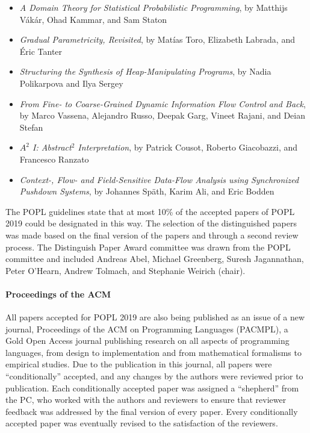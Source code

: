 \begin{itemize}
\item {\em A Domain Theory for Statistical Probabilistic Programming}, by 
Matthijs Vákár, Ohad Kammar, and Sam Staton
\item {\em Gradual Parametricity, Revisited}, by
Matías Toro, Elizabeth Labrada, and Éric Tanter
\item {\em Structuring the Synthesis of Heap-Manipulating Programs}, by 
Nadia Polikarpova and Ilya Sergey
\item {\em From Fine- to Coarse-Grained Dynamic Information Flow Control and
    Back}, by
Marco Vassena, Alejandro Russo, Deepak Garg, Vineet Rajani, and Deian Stefan
\item {\em $A^2$ I: Abstract$^2$ Interpretation}, by 
Patrick Cousot, Roberto Giacobazzi, and Francesco Ranzato
\item {\em Context-, Flow- and Field-Sensitive Data-Flow Analysis using
  Synchronized Pushdown Systems}, by
Johannes Späth, Karim Ali, and Eric Bodden
\end{itemize}

The POPL guidelines state that at most 10\% of the accepted papers of POPL
2019 could be designated in this way.  The selection of the distinguished
papers was made based on the final version of the papers and through a second
review process. The Distinguish Paper Award committee was drawn from the POPL
committee and included Andreas Abel, Michael Greenberg, Suresh Jagannathan,
Peter O'Hearn, Andrew Tolmach, and Stephanie Weirich (chair).

\paragraph{Proceedings of the ACM}
%
All papers accepted for POPL 2019 are also being published as an issue of a
new journal, Proceedings of the ACM on Programming Languages (PACMPL), a Gold
Open Access journal publishing research on all aspects of programming
languages, from design to implementation and from mathematical formalisms to
empirical studies.  Due to the publication in this journal, all papers were
``conditionally'' accepted, and any changes by the authors were reviewed prior
to publication. Each conditionally accepted paper
was assigned a ``shepherd'' from the PC, who worked with the authors
and reviewers to ensure that reviewer feedback was addressed by the
final version of every paper. Every conditionally accepted paper was
eventually revised to the satisfaction of the reviewers.



